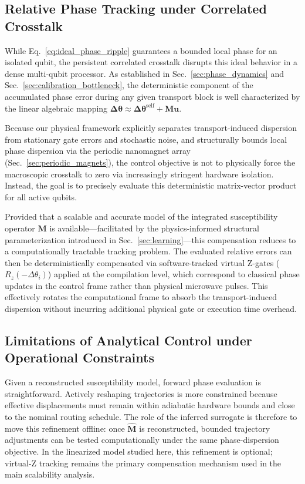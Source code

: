 \documentclass[a4paper,twocolumn,11pt]{quantumarticle}
\begin{document}
\subsection{Relative Phase Tracking under Correlated Crosstalk}
\label{sec:coupled_tracking}

While Eq.~\eqref{eq:ideal_phase_ripple} guarantees a bounded local phase for an isolated qubit, the persistent correlated crosstalk disrupts this ideal behavior in a dense multi-qubit processor. As established in Sec.~\ref{sec:phase_dynamics} and Sec.~\ref{sec:calibration_bottleneck}, the deterministic component of the accumulated phase error during any given transport block is well characterized by the linear algebraic mapping $\boldsymbol{\Delta\theta} \approx \boldsymbol{\Delta\theta}^{\text{self}} + \mathbf{M} \mathbf{u}$. 

Because our physical framework explicitly separates transport-induced dispersion from stationary gate errors and stochastic noise, and structurally bounds local phase dispersion via the periodic nanomagnet array (Sec.~\ref{sec:periodic_magnets}), the control objective is not to physically force the macroscopic crosstalk to zero via increasingly stringent hardware isolation. Instead, the goal is to precisely evaluate this deterministic matrix-vector product for all active qubits.

Provided that a scalable and accurate model of the integrated susceptibility operator $\mathbf{M}$ is available—facilitated by the physics-informed structural parameterization introduced in Sec.~\ref{sec:learning}—this compensation reduces to a computationally tractable tracking problem. The evaluated relative errors can then be deterministically compensated via software-tracked virtual Z-gates ($R_z(-\Delta\theta_i)$) applied at the compilation level, which correspond to classical phase updates in the control frame rather than physical microwave pulses. This effectively rotates the computational frame to absorb the transport-induced dispersion without incurring additional physical gate or execution time overhead.

\subsection{Limitations of Analytical Control under Operational Constraints}
\label{sec:analytical_limits}

Given a reconstructed susceptibility model, forward phase evaluation is straightforward. Actively reshaping trajectories is more constrained because effective displacements must remain within adiabatic hardware bounds and close to the nominal routing schedule. The role of the inferred surrogate is therefore to move this refinement offline: once $\hat{\mathbf M}$ is reconstructed, bounded trajectory adjustments can be tested computationally under the same phase-dispersion objective. In the linearized model studied here, this refinement is optional; virtual-Z tracking remains the primary compensation mechanism used in the main scalability analysis.
\end{document}
